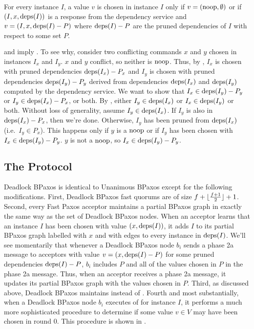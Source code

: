 \begin{invariant}
  For every instance $I$, a value $v$ is chosen in instance $I$ only if $v =
  (\text{noop}, \emptyset)$ or if $(I, x, \text{deps}(I))$ is a response from the
  dependency service and $v = (I, x, \text{deps}(I) - P)$ where $\text{deps}(I) - P$ are
  the pruned dependencies of $I$ with respect to some set $P$.
\end{invariant}

 and  imply
. To see why, consider two conflicting commands $x$
and $y$ chosen in instances $I_x$ and $I_y$. $x$ and $y$ conflict, so neither
is $\text{noop}$. Thus, by , $I_x$ is chosen with pruned
dependencies $\text{deps}(I_x) - P_x$ and $I_y$ is chosen with pruned dependencies
$\text{deps}(I_y) - P_y$ derived from dependencies $\text{deps}(I_x)$ and $\text{deps}(I_y)$
computed by the dependency service. We want to show that $I_x \in \text{deps}(I_y) -
P_y$ or $I_y \in \text{deps}(I_x) - P_x$, or both.
%
By , either $I_y \in \text{deps}(I_x)$ or $I_x \in
\text{deps}(I_y)$ or both. Without loss of generality, assume $I_y \in \text{deps}(I_x)$.
If $I_y$ is also in $\text{deps}(I_x) - P_x$, then we're done. Otherwise, $I_y$ has
been pruned from $\text{deps}(I_x)$ (i.e.\ $I_y \in P_x$). This happens only if $y$
is a $\text{noop}$ or if $I_y$ has been chosen with $I_x \in \text{deps}(I_y) - P_y$. $y$
is not a $\text{noop}$, so $I_x \in \text{deps}(I_y) - P_y$.

\subsection{The Protocol}
Deadlock BPaxos is identical to Unanimous BPaxos except for the
following modifications.
%
First, Deadlock BPaxos fast quorums are of size $f + \lfloor\frac{f + 1}{2}\rfloor + 1$.
%
Second, every Fast Paxos acceptor maintains a partial BPaxos graph in exactly
the same way as the set of Deadlock BPaxos nodes. When an acceptor learns that
an instance $I$ has been chosen with value $(x, \text{deps}(I))$, it adds $I$ to its
partial BPaxos graph labelled with $x$ and with edges to every instance in
$\text{deps}(I)$.  We'll see momentarily that whenever a Deadlock BPaxos node $b_i$
sends a phase 2a message to acceptors with value $v = (x, \text{deps}(I) - P)$ for
some pruned dependencies $\text{deps}(I) - P$, $b_i$ includes $P$ and all of the
values chosen in $P$ in the phase 2a message. Thus, when an acceptor receives a
phase 2a message, it updates its partial BPaxos graph with the values chosen in
$P$.
%
Third, as discussed above, Deadlock BPaxos maintains
 instead of .
%
Fourth and most substantially, when a Deadlock BPaxos node $b_i$ executes
 of  for instance $I$, it
performs a much more sophisticated procedure to determine if some value $v \in
V$ may have been chosen in round $0$. This procedure is shown in
.

